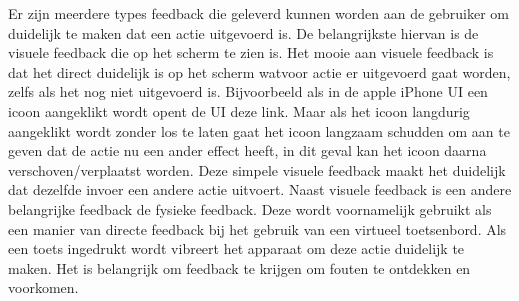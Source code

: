 Er zijn meerdere types feedback die geleverd kunnen worden aan de gebruiker om duidelijk te maken dat een actie uitgevoerd is.
De belangrijkste hiervan is de visuele feedback die op het scherm te zien is.
Het mooie aan visuele feedback is dat het direct duidelijk is op het scherm watvoor actie er uitgevoerd gaat worden, zelfs als het nog niet uitgevoerd is.
Bijvoorbeeld als in de apple iPhone UI een icoon aangeklikt wordt opent de UI deze link.
Maar als het icoon langdurig aangeklikt wordt zonder los te laten gaat het icoon langzaam schudden om aan te geven dat de actie nu een ander effect heeft, in dit geval kan het icoon daarna verschoven/verplaatst worden.
Deze simpele visuele feedback maakt het duidelijk dat dezelfde invoer een andere actie uitvoert.
 Naast visuele feedback is een andere belangrijke feedback de fysieke feedback.
Deze wordt voornamelijk gebruikt als een manier van directe feedback bij het gebruik van een virtueel toetsenbord.
Als een toets ingedrukt wordt vibreert het apparaat om deze actie duidelijk te maken.
Het is belangrijk om feedback te krijgen om fouten te ontdekken en voorkomen.



